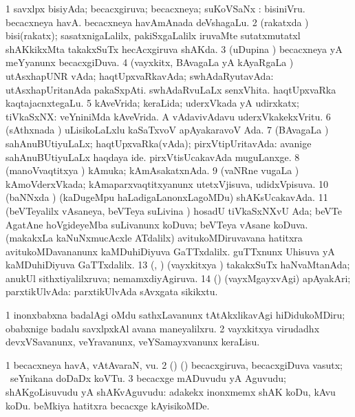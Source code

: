 {\bentry
{} 
\gl{\gu}
\expl{}
\bmng
\bnum
\num{1} savxlpx bisiyAda; becacxgiruva; becacxneya; suKoVSaNx :  bisiniVru.  becacxneya havA.  becacxneya havAmAnada deVshagaLu. 
\num{2} (rakatxda \vi) bisi(rakatx); sasatxnigaLalilx, pakiSxgaLalilx iruvaMte sutatxmutatxl shAKkikxMta takakxSuTx hecAcxgiruva shAKda. 
\num{3} (uDupina \vi) becacxneya yA meYyanunx becacxgiDuva. 
\num{4} (vayxkitx, BAvagaLa yA kAyaRgaLa \vi) utAsxhapUNR vAda; haqtUpxvaRkavAda; swhAdaRyutavAda:  utAsxhapUritanAda pakaSxpAti.  swhAdaRvuLaLx senxVhita.  haqtUpxvaRka kaqtajacnxtegaLu. 
\num{5} kAveVrida; keraLida; uderxVkada yA udirxkatx; tiVkaSxNX:  veYniniMda kAveVrida.  A vAdavivAdavu uderxVkakekxVritu. 
\num{6} (sAthxnada \vi) uLisikoLaLxlu kaSaTxvoV apAyakaravoV Ada. 
\num{7} (BAvagaLa \vi) sahAnuBUtiyuLaLx; haqtUpxvaRka(vAda); pirxVtipUritavAda:  avanige sahAnuBUtiyuLaLx haqdaya ide.  pirxVtisUcakavAda muguLanxge. 
\num{8} (manoVvaqtitxya \vi) kAmuka; kAmAsakatxnAda. 
\num{9} (vaNRne \mo vugaLa \vi) kAmoVderxVkada; kAmaparxvaqtitxyanunx utetxVjisuva, udidxVpisuva. 
\num{10} (baNNxda \vi) (kaDugeMpu haLadigaLanonxLagoMDu) shAKsUcakavAda. 
\num{11} (beVTeyalilx vAsaneya, beVTeya suLivina \vi) hosadU tiVkaSxNXvU Ada; beVTe AgatAne hoVgideyeMba suLivanunx koDuva; beVTeya vAsane koDuva. 
\banum
{} (makakxLa kaNuNxmucAcxle ATdalilx) avitukoMDiruvavana hatitxra avitukoMDavananunx kaMDuhiDiyuva GaTTxdalilx. 
 guTTxnunx Uhisuva yA kaMDuhiDiyuva GaTTxdalilx. 
\eanum
\numie
\num{13} (\pArxparx, \AmA) (vayxkitxya \vi) takakxSuTx haNvaMtanAda; anukUl sithxtiyalilxruva; nemamxdiyAgiruva. 
\num{14} (\AmA) (vayxMgayxvAgi) apAyakAri; parxtikUlvAda:  parxtikUlvAda sAvxgata sikikxtu. 
\enum
\emng

\noindent 
\gl{\pagu}
\expl{}
\bmng
\bnum
\num{1}  inonxbabxna badalAgi oMdu sathxLavanunx tAtAkxlikavAgi hiDidukoMDiru; obabxnige badalu savxlpxkAl avana maneyalilxru. 
\num{2}  vayxkitxya virudadhx devxVSavanunx, veYravanunx, veYSamayxvanunx keraLisu. 
\enum
\emng
\eentry

\bentry
{} 
\gl{\nA}
\expl{}
\bmng
\bnum
\num{1} becacxneya havA, vAtAvaraN, \mo vu. 
\num{2} (\birx) (\pArxparx) becacxgiruva, becacxgiDuva vasutx; \kanmu\ seYnikana doDaDx koVTu. 
\num{3} becacxge mADuvudu yA Aguvudu; shAKgoLisuvudu yA shAKvAguvudu:  adakekx inonxmemx shAK koDu, kAvu koDu.  beMkiya hatitxra becacxge kAyisikoMDe. 
\enum
\emng
\eentry

}
